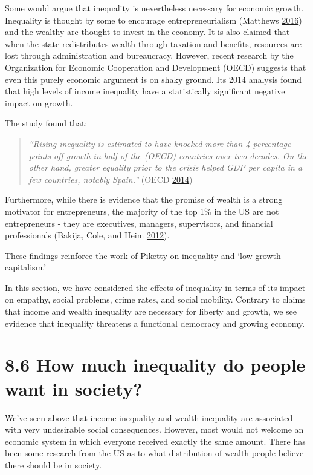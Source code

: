 \documentclass[]{tufte-handout}
\begin{document}
Some would argue that inequality is nevertheless necessary for economic
growth. Inequality is thought by some to encourage entrepreneurialism
(Matthews \protect\hyperlink{ref-Matthews2016}{2016}) and the wealthy
are thought to invest in the economy. It is also claimed that when the
state redistributes wealth through taxation and benefits, resources are
lost through administration and bureaucracy. However, recent research by
the Organization for Economic Cooperation and Development (OECD)
suggests that even this purely economic argument is on shaky ground. Its
2014 analysis found that high levels of income inequality have a
statistically significant negative impact on growth.

The study found that:

\begin{quote}
\emph{``Rising inequality is estimated to have knocked more than 4
percentage points off growth in half of the (OECD) countries over two
decades. On the other hand, greater equality prior to the crisis helped
GDP per capita in a few countries, notably Spain.''} (OECD
\protect\hyperlink{ref-OE2014}{2014})
\end{quote}

Furthermore, while there is evidence that the promise of wealth is a
strong motivator for entrepreneurs, the majority of the top 1\% in the
US are not entrepreneurs - they are executives, managers, supervisors,
and financial professionals (Bakija, Cole, and Heim
\protect\hyperlink{ref-Bakija2012}{2012}).

These findings reinforce the work of Piketty on inequality and `low
growth capitalism.'

In this section, we have considered the effects of inequality in terms
of its impact on empathy, social problems, crime rates, and social
mobility. Contrary to claims that income and wealth inequality are
necessary for liberty and growth, we see evidence that inequality
threatens a functional democracy and growing economy.

\hypertarget{how-much-inequality-do-people-want-in-society}{%
\section{8.6 How much inequality do people want in
society?}\label{how-much-inequality-do-people-want-in-society}}

We've seen above that income inequality and wealth inequality are
associated with very undesirable social consequences. However, most
would not welcome an economic system in which everyone received exactly
the same amount. There has been some research from the US as to what
distribution of wealth people believe there should be in society.
\end{document}
